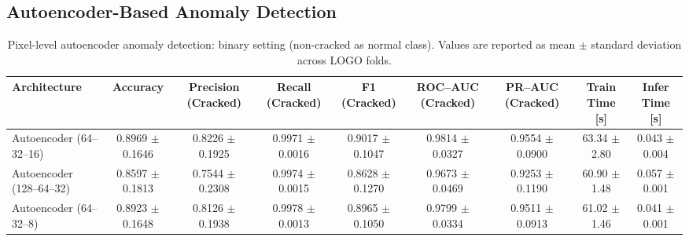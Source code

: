 \subsection{Autoencoder-Based Anomaly Detection}

\begin{table}[!htbp]
    \centering
    \small
    \caption[Autoencoder anomaly detection: binary (full CV)]{Pixel-level autoencoder anomaly detection: binary setting (non-cracked as normal class). Values are reported as mean $\pm$ standard deviation across LOGO folds.}
    \label{tab:autoencoder_pixel_results_full}
    \renewcommand{\arraystretch}{1.2}
    \setlength{\tabcolsep}{5pt}
    \begin{adjustbox}{max width=\linewidth,center}
    \begin{tabular}{@{}lcccccccc@{}}
        \toprule
        Architecture & Accuracy & Precision (Cracked) & Recall (Cracked) & F1 (Cracked) & ROC--AUC (Cracked) & PR--AUC (Cracked) & Train Time [s] & Infer Time [s] \\
        \midrule
        Autoencoder (64--32--16) & 0.8969 $\pm$ 0.1646 & 0.8226 $\pm$ 0.1925 & 0.9971 $\pm$ 0.0016 & 0.9017 $\pm$ 0.1047 & 0.9814 $\pm$ 0.0327 & 0.9554 $\pm$ 0.0900 & 63.34 $\pm$ 2.80 & 0.043 $\pm$ 0.004 \\
        Autoencoder (128--64--32) & 0.8597 $\pm$ 0.1813 & 0.7544 $\pm$ 0.2308 & 0.9974 $\pm$ 0.0015 & 0.8628 $\pm$ 0.1270 & 0.9673 $\pm$ 0.0469 & 0.9253 $\pm$ 0.1190 & 60.90 $\pm$ 1.48 & 0.057 $\pm$ 0.001 \\
        Autoencoder (64--32--8) & 0.8923 $\pm$ 0.1648 & 0.8126 $\pm$ 0.1938 & 0.9978 $\pm$ 0.0013 & 0.8965 $\pm$ 0.1050 & 0.9799 $\pm$ 0.0334 & 0.9511 $\pm$ 0.0913 & 61.02 $\pm$ 1.46 & 0.041 $\pm$ 0.001 \\
        \bottomrule
    \end{tabular}
    \end{adjustbox}
\end{table}

